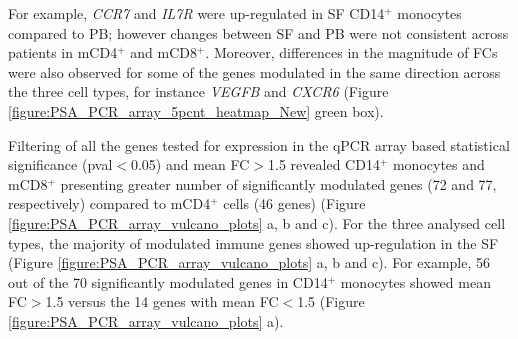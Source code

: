 For example, \textit{CCR7} and \textit{IL7R} were up-regulated in SF CD14$^+$ monocytes compared to PB; however changes between SF and PB were not consistent across patients in mCD4$^+$ and mCD8$^+$. Moreover, differences in the magnitude of FCs were also observed for some of the genes modulated in the same direction across the three cell types, for instance \textit{VEGFB} and \textit{CXCR6} (Figure \ref{figure:PSA_PCR_array_5pcnt_heatmap_New} green box).


Filtering of all the genes tested for expression in the qPCR array based statistical significance (pval$<$0.05) and mean FC$>$1.5 revealed CD14$^+$ monocytes and mCD8$^+$ presenting greater number of significantly modulated genes (72 and 77, respectively) compared to mCD4$^+$ cells (46 genes) (Figure \ref{figure:PSA_PCR_array_vulcano_plots} a, b and c). For the three analysed cell types, the majority of modulated immune genes showed up-regulation in the SF (Figure \ref{figure:PSA_PCR_array_vulcano_plots} a, b and c). For example, 56 out of the 70 significantly modulated genes in CD14$^+$ monocytes showed mean FC$>$1.5 versus the 14 genes with mean FC$<$1.5 (Figure \ref{figure:PSA_PCR_array_vulcano_plots} a).



